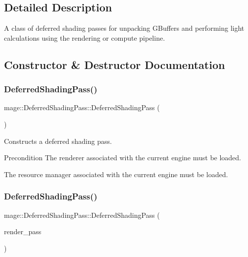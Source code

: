 \subsection{Detailed Description}
A class of deferred shading passes for unpacking G\+Buffers and performing light calculations using the rendering or compute pipeline. 

\subsection{Constructor \& Destructor Documentation}
\hypertarget{classmage_1_1_deferred_shading_pass_a348c86ce12342110299739d8d63c6aaf}{}\label{classmage_1_1_deferred_shading_pass_a348c86ce12342110299739d8d63c6aaf} 
\subsubsection{\texorpdfstring{Deferred\+Shading\+Pass()}{DeferredShadingPass()}\hspace{0.1cm}{\footnotesize\ttfamily [1/3]}}
{\footnotesize\ttfamily mage\+::\+Deferred\+Shading\+Pass\+::\+Deferred\+Shading\+Pass (\begin{DoxyParamCaption}{ }\end{DoxyParamCaption})}

Constructs a deferred shading pass.

\begin{DoxyPrecond}{Precondition}
The renderer associated with the current engine must be loaded. 

The resource manager associated with the current engine must be loaded. 
\end{DoxyPrecond}
\hypertarget{classmage_1_1_deferred_shading_pass_a4820a800b8ffc4cf0a7d155b09b71210}{}\label{classmage_1_1_deferred_shading_pass_a4820a800b8ffc4cf0a7d155b09b71210} 
\subsubsection{\texorpdfstring{Deferred\+Shading\+Pass()}{DeferredShadingPass()}\hspace{0.1cm}{\footnotesize\ttfamily [2/3]}}
{\footnotesize\ttfamily mage\+::\+Deferred\+Shading\+Pass\+::\+Deferred\+Shading\+Pass (\begin{DoxyParamCaption}\item[{const \hyperlink{classmage_1_1_deferred_shading_pass}{Deferred\+Shading\+Pass} \&}]{render\+\_\+pass }\end{DoxyParamCaption})\hspace{0.3cm}{\ttfamily [delete]}}

